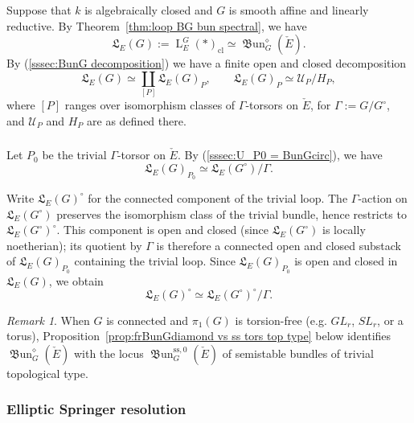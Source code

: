 \documentclass[12pt, oneside]{amsart}
\numberwithin{equation}{section}
\theoremstyle{remark}
\newtheorem{remark}[subsubsection]{Remark}
\theoremstyle{plain}
\newcommand{\frL}{\mathfrak{L}}
\newcommand{\Loop}{\operatorname{L}}
\newcommand{\UU}{\mathcal{U}}
\newcommand{\cl}{{\operatorname{cl}}}
\renewcommand{\ss}{\mathrm{ss}}
\newcommand{\frBun}{\operatorname{\mathfrak{B}un}}
\begin{document}
\subsubsection{}\label{sssec:LG P component}

Suppose that $k$ is algebraically closed and $G$ is smooth affine and linearly reductive.
By Theorem~\ref{thm:loop BG bun spectral}, we have
\[
  \frL_E(G):=\Loop_E^G(*)_\cl
  \simeq\frBun_G^\diamond(\check{E}).
\]
By (\ref{sssec:BunG decomposition}) we have a finite open
and closed decomposition
\[
  \frL_E(G)\simeq\coprod_{[P]}\frL_E(G)_P,
  \qquad
  \frL_E(G)_P\simeq\UU_P/H_P,
\]
where $[P]$ ranges over isomorphism classes of $\Gamma$-torsors on $
\check{E}$, for $\Gamma := G/G^\circ$, and $\UU_P$ and $H_P$ are as defined there.

\subsubsection{}\label{sssec:LG circ G^o}

Let $P_0$ be the trivial $\Gamma$-torsor on $\check{E}$.
By (\ref{sssec:U_P0 = BunGcirc}), we have
\[
  \frL_E(G)_{P_0}\simeq\frL_E(G^\circ)/\Gamma.
\]

Write $\frL_E(G)^\circ$ for the connected component of the trivial loop.
The $\Gamma$-action on $\frL_E(G^\circ)$ preserves the isomorphism class of
the trivial bundle, hence restricts to $\frL_E(G^\circ)^\circ$.
This component is open and closed (since $\frL_E(G^\circ)$ is locally
noetherian); its quotient by $\Gamma$ is therefore a connected open and closed substack of $\frL_E(G)_{P_0}$ containing the trivial loop.
Since $\frL_E(G)_{P_0}$ is open and closed in $\frL_E(G)$, we obtain
\[
  \frL_E(G)^\circ
  \simeq \frL_E(G^\circ)^\circ/\Gamma.
\]

\begin{remark}
  When $G$ is connected and $\pi_1(G)$ is torsion-free (e.g. $GL_r$, $SL_r$, or a torus), Proposition~\ref{prop:frBunGdiamond vs ss tors top type} below identifies $\frBun_G^\diamond(\check{E})$ with the locus $\frBun_G^{\ss,0}(\check{E})$ of semistable bundles of trivial topological type.
\end{remark}

\subsubsection{Elliptic Springer resolution}\label{springer}
\end{document}
